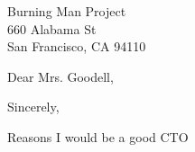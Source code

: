 

	{Burning Man Project
	\\660 Alabama St
	\\San Francisco, CA 94110}

\date{January 10, 2020}
\opening{Dear Mrs. Goodell,}
\closing{Sincerely,}
\makelettertitle

Reasons I would be a good CTO

\makeletterclosing


